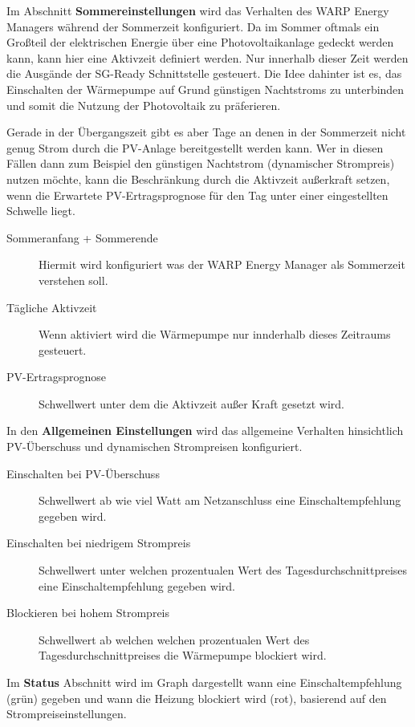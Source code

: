 \documentclass[a4paper,10pt]{article}
\begin{document}
\begin{multicols*}{2}
    Im Abschnitt \textbf{Sommereinstellungen} wird das Verhalten des WARP Energy Managers während der Sommerzeit konfiguriert.
    Da im Sommer oftmals ein Großteil der elektrischen Energie über eine Photovoltaikanlage gedeckt werden kann, kann hier eine Aktivzeit definiert werden. 
    Nur innerhalb dieser Zeit werden die Ausgände der SG-Ready Schnittstelle gesteuert. Die Idee dahinter ist es, das Einschalten der Wärmepumpe auf Grund
    günstigen Nachtstroms zu unterbinden und somit die Nutzung der Photovoltaik zu präferieren.
    
    Gerade in der Übergangszeit gibt es aber Tage an denen in der Sommerzeit nicht genug Strom durch die PV-Anlage bereitgestellt werden kann. 
    Wer in diesen Fällen dann zum Beispiel den günstigen Nachtstrom (dynamischer Strompreis) nutzen möchte, kann  die Beschränkung durch die
    Aktivzeit außerkraft setzen, wenn die Erwartete PV-Ertragsprognose für den Tag unter einer eingestellten Schwelle liegt.
    
   	\begin{description}
    \item[Sommeranfang + Sommerende] Hiermit wird konfiguriert was der WARP Energy Manager als Sommerzeit verstehen soll.
    \item[Tägliche Aktivzeit] Wenn aktiviert wird die Wärmepumpe nur innderhalb dieses Zeitraums gesteuert.
    \item[PV-Ertragsprognose] Schwellwert unter dem die Aktivzeit außer Kraft gesetzt wird.
   	\end{description}

    In den \textbf{Allgemeinen Einstellungen} wird das allgemeine Verhalten hinsichtlich PV-Überschuss und dynamischen Strompreisen konfiguriert.

   	\begin{description}
    \item[Einschalten bei PV-Überschuss] Schwellwert ab wie viel Watt am Netzanschluss eine Einschaltempfehlung gegeben wird.
    \item[Einschalten bei niedrigem Strom­preis] Schwellwert unter welchen prozentualen Wert des Tagesdurchschnittpreises eine Einschaltempfehlung gegeben wird.
    \item[Blo­ckie­ren bei hohem Strom­preis] Schwellwert ab welchen welchen prozentualen Wert des Tagesdurchschnittpreises die Wärmepumpe blockiert wird.
   	\end{description}
    
    Im \textbf{Status} Abschnitt wird im Graph dargestellt wann eine Einschaltempfehlung (grün) gegeben und wann die Heizung blockiert wird (rot), basierend
    auf den Strompreiseinstellungen.
    

\end{multicols*}
\end{document}
